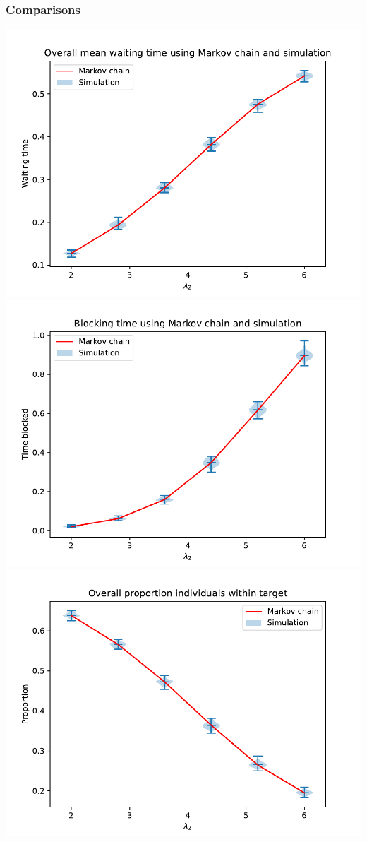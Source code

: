 \begin{frame}
    \frametitle{Comparisons}

    \begin{multicols}{3}
        \includegraphics[scale=0.2]{Bin/performance_measures_comparison/waiting_overall_comparison.pdf}
        \includegraphics[scale=0.2]{Bin/performance_measures_comparison/blocking_comparison.pdf}
        \includegraphics[scale=0.2]{Bin/performance_measures_comparison/proportion_overall_comparison.pdf}
        

\end{multicols}
\end{frame}
